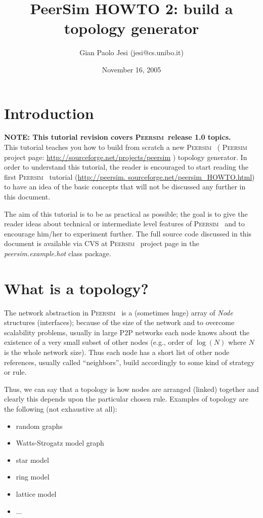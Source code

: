 \documentclass[a4paper,11pt]{article}
\title{PeerSim HOWTO 2: build a topology generator}
\author{Gian Paolo Jesi (jesi@cs.unibo.it)}
\date{November 16, 2005}
\newcommand{\id}[1]{{\scshape\small #1}}
\newcommand{\psim}{\id{Peersim}}
\begin{document}
\maketitle

\section{Introduction}

\textbf{NOTE: This tutorial revision covers \psim~release 1.0
  topics.}\\

This tutorial teaches you how to build from scratch a new \psim~
( \psim~ project page: \url{http://sourceforge.net/projects/peersim}
) topology generator. In order to understand this tutorial, the reader
is encouraged to start reading the first \psim~ tutorial 
(\url{http://peersim. sourceforge.net/peersim_HOWTO.html}) 
to have an idea of the basic concepts that will not be discussed any
further in this document. 

The aim of this tutorial is to be as practical as possible; the goal
is to give the reader ideas about technical or intermediate level
features of \psim~ and to encourage him/her to experiment further.
The full source code discussed in this document is available via CVS
at \psim~ project page in the \emph{peersim.example.hot} class package.


\section{What is a topology?}

The network abstraction in \psim~ is a (sometimes huge) array of
\emph{Node} structures (interfaces); because of the size of the network
and to overcome scalability problems, usually in large P2P networks
each node knows about the existence of a very small subset of other
nodes (e.g., order of $\log(N)$ where $N$ is the whole network size). Thus
each node has a short list of other node references, usually called
``neighbors'', build accordingly to some kind of strategy
or rule. 

Thus, we can say that a topology is how nodes are arranged (linked)
together and clearly this depends upon the particular chosen rule.
Examples of topology are the following (not exhaustive at all): 

\begin{itemize}
\item random graphs 
\item Watts-Strogatz model graph 
\item star model 
\item ring model 
\item lattice model 
\item ...
\end{itemize}
\end{document}
